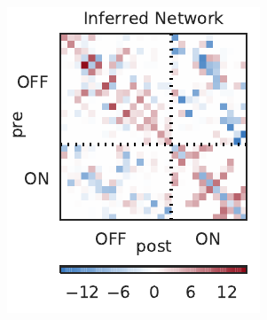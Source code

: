 \begin{figure}[t!]
  \centering
    \begin{subfigure}[b]{1.85in}
    \centering
    \caption{}
    \vspace{-.2in}
    \includegraphics[width=\textwidth]{figures/ch3/rgc_connectivity.pdf}
    \label{fig:rgc_w}
  \end{subfigure}
  ~
    \begin{subfigure}[b]{1.85in}
    \centering
    \caption{}
    \vspace{-.2in}

\end{subfigure}
\end{figure}
